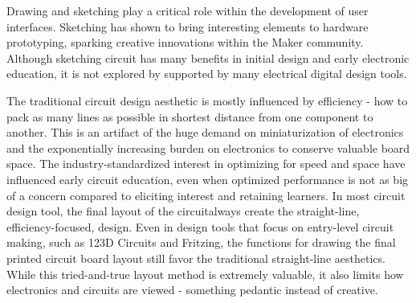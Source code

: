 \documentclass{sigchi}
\begin{document}
Drawing and sketching play a critical role within the development of user interfaces. Sketching has shown to bring interesting elements to hardware prototyping, sparking creative innovations within the Maker community.
Although sketching circuit has many benefits in initial design and early electronic education, it is not explored by supported by many electrical digital design tools.


The traditional circuit design aesthetic is mostly influenced by efficiency - how to pack as many lines as possible in shortest distance from one component to another.
This is an artifact of the huge demand on miniaturization of electronics and the exponentially increasing burden on electronics to conserve valuable board space.
The industry-standardized interest in optimizing for speed and space have influenced early circuit education, even when optimized performance is not as big of a concern compared to eliciting interest and retaining learners.
In most circuit design tool, the final layout of the circuitalways create the straight-line, efficiency-focused, design.
Even in design tools that focus on entry-level circuit making, such as 123D Circuits and Fritzing, the functions for drawing the final printed circuit board layout still favor the traditional straight-line aesthetics.
While this tried-and-true layout method is extremely valuable, it also limits how electronics and circuits are viewed - something pedantic instead of creative.
\end{document}
